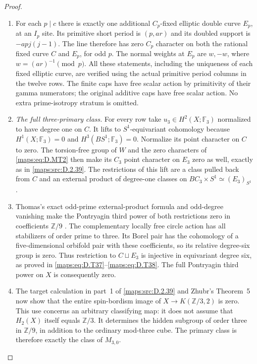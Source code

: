 \begin{proof}
\begin{enumerate}[label=\arabic*.,leftmargin=*]
\item For each $p\mid c$ there is exactly one additional
$C_p$-fixed elliptic double curve $E_p$, at an $I_p$ site.
Its primitive short period is $(p,ar)$ and its doubled support
is $-ap j(j-1)$. The line therefore has zero $C_p$ character
on both the rational fixed curve $C$ and $E_p$, for odd $p$.
The normal weights at $E_p$ are $w,-w$, where
$w=(ar)^{-1}\pmod p$. All these statements, including the
uniqueness of each fixed elliptic curve, are verified using
the actual primitive period columns in the twelve rows.
The finite caps have free scalar action by primitivity of
their gamma numerators; the original additive caps have
free scalar action. No extra prime-isotropy stratum is omitted.

\item \emph{The full three-primary class.}
For every row take $u_3\in H^2(X;\mathbb F_3)$ normalized
to have degree one on $C$. It lifts to $S^1$-equivariant
cohomology because $H^1(X;\mathbb F_3)=0$ and
$H^3(BS^1;\mathbb F_3)=0$. Normalize its point character
on $C$ to zero. The torsion-free group of $W$ and the
zero characters of \eqref{maps:eq:D.MT2} then make its $C_3$ point
character on $E_3$ zero as well, exactly as in \ref{maps:src:D.2.39}.
The restrictions of this lift are a class pulled back from
$C$ and an external product of degree-one classes on
$BC_3\times S^1\simeq(E_3)_{S^1}$.

\item Thomas's exact odd-prime external-product formula and
odd-degree vanishing make the Pontryagin third power of
both restrictions zero in coefficients $\mathbb Z/9$
\cite[equations (2.3), (2.5), p.267]{ffThomas56}.
The complementary locally free circle action has all
stabilizers of order prime to three. Its Borel pair has
the cohomology of a five-dimensional orbifold pair with
these coefficients, so its relative degree-six group
is zero. Thus restriction to $C\sqcup E_3$ is injective
in equivariant degree six, as proved in \eqref{maps:eq:D.T37}--\eqref{maps:eq:D.T38}.
The full Pontryagin third power on $X$ is consequently zero.

\item The target calculation in part~1 of \ref{maps:src:D.2.39} and Zhubr's
Theorem~5 now show that the entire spin-bordism image of
$X\to K(\mathbb Z/3,2)$ is zero. This use concerns an
arbitrary classifying map: it does not assume that
$H_2(X)$ itself equals $\mathbb Z/3$. It determines the
hidden subgroup of order three in $\mathbb Z/9$, in
addition to the ordinary mod-three cube. The primary
class is therefore exactly the class of $M_{3,0}$.


\end{enumerate}
\end{proof}
